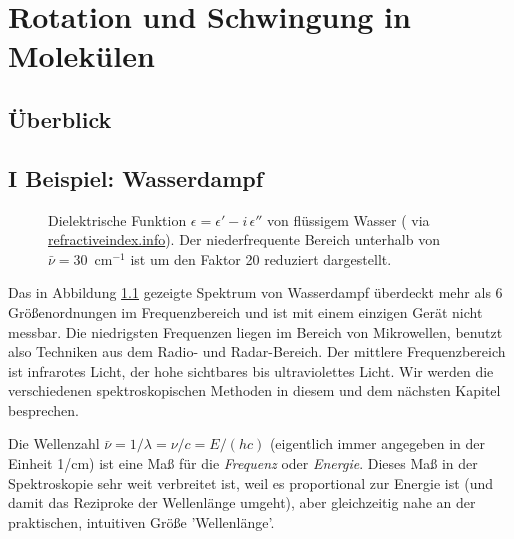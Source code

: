 \renewcommand{\lastmod}{13. Dezember 2024}
\renewcommand{\chapterauthors}{Markus Lippitz}

\chapter{Rotation und Schwingung in Molekülen}



\section{Überblick}


\section{I Beispiel: Wasserdampf}

\begin{figure}
\caption{Dielektrische Funktion $\epsilon = \epsilon' - i \, \epsilon''$ von flüssigem Wasser (\cite{Segelstein_water} via 
\href{https://refractiveindex.info/?shelf=main&book=H2O&page=Segelstein}{refractiveindex.info}). Der niederfrequente Bereich unterhalb von $\bar{\nu} = 30$~cm$^{-1}$ ist um den Faktor 20 reduziert dargestellt.
\label{fig:diel_water}}

\end{figure}


Das in Abbildung \ref{fig:diel_water}  gezeigte Spektrum von Wasserdampf überdeckt mehr als 6 Größenordnungen im Frequenzbereich und ist mit einem einzigen Gerät nicht  messbar. Die niedrigsten Frequenzen liegen im Bereich von Mikrowellen, benutzt also Techniken aus dem Radio- und Radar-Bereich. Der mittlere Frequenzbereich ist infrarotes Licht, der hohe sichtbares bis ultraviolettes Licht. Wir werden die verschiedenen spektroskopischen Methoden in diesem und dem nächsten  Kapitel besprechen.


Die Wellenzahl $\bar{\nu} = 1 / \lambda =\nu / c =  E / (h c)$ (eigentlich immer angegeben in der Einheit 1/cm) ist eine Maß für die  \emph{Frequenz} oder \emph{Energie}. Dieses Maß in der Spektroskopie sehr weit verbreitet ist, weil es proportional zur Energie ist (und damit das Reziproke der Wellenlänge umgeht), aber gleichzeitig nahe an der praktischen, intuitiven Größe 'Wellenlänge'.



